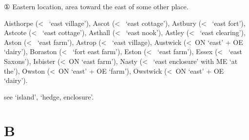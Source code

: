 \documentclass[12pt,letterpaper,oneside,article,draft]{memoir}
\begin{document}
\begin{Lemma}
\begin{Etymology}
\end{Etymology}
\begin{Definitions}
	① Eastern location, area toward the east of some other place.
\end{Definitions}
\begin{Examples}
	Aisthorpe (<~ ‘east village’), Ascot (<~ ‘east cottage’), Astbury (<~ ‘east fort’), Astcote (<~ ‘east cottage’), Asthall (<~ ‘east nook’), Astley (<~ ‘east clearing’), Aston (<~ ‘east farm’), Astrop (<~ ‘east village), Austwick (<~ON  ‘east’ + OE  ‘dairy’), Boraston (<~ ‘fort east farm’), Eston (<~ ‘east farm’), Essex (<~ ‘east Saxons’), Isbister (<~ON  ‘east farm’), Nasty (<~ ‘east enclosure’ with ME  ‘at the’), Owston (<~ON  ‘east’ + OE  ‘farm’), Owstwick (<~ON  ‘east’ + OE  ‘dairy’).
\end{Examples}
\end{Lemma}

\begin{Lemma}
 see  ‘island’,  ‘hedge, enclosure’.
\end{Lemma}

\section*{B}
\end{document}
